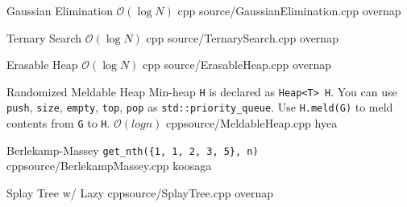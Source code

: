 \documentclass[landscape, 10pt, a4paper, oneside, twocolumn]{extarticle}
\begin{document}
\Algorithm
{Gaussian Elimination}
{}
{$\mathcal{O}(\log{N})$}
{cpp}
{source/GaussianElimination.cpp}
{overnap}

\Algorithm
{Ternary Search}
{}
{$\mathcal{O}(\log{N})$}
{cpp}
{source/TernarySearch.cpp}
{overnap}

\Algorithm
{Erasable Heap}
{}
{$\mathcal{O}(\log{N})$}
{cpp}
{source/ErasableHeap.cpp}
{overnap}

\Algorithm
{Randomized Meldable Heap}
{Min-heap \texttt{H} is declared as \texttt{Heap<T> H}. You can use \texttt{push}, \texttt{size}, \texttt{empty}, \texttt{top}, \texttt{pop} as \texttt{std::priority\_queue}. Use \texttt{H.meld(G)} to meld contents from \texttt{G} to \texttt{H}. }
{$\mathcal{O}(log n)$}
{cpp}{source/MeldableHeap.cpp}
{hyea}

\Algorithm
{Berlekamp-Massey}
{\texttt{get\_nth(\{1, 1, 2, 3, 5\}, n)}}
{}
{cpp}{source/BerlekampMassey.cpp}
{koosaga}

\Algorithm
{Splay Tree w/ Lazy}
{}
{}
{cpp}{source/SplayTree.cpp}
{overnap}

\end{document}
